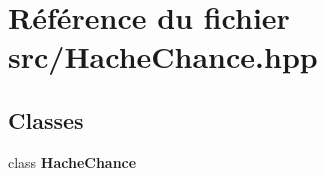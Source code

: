 \section{Référence du fichier src/\-Hache\-Chance.hpp}
\label{_hache_chance_8hpp}
\subsection*{Classes}
\begin{DoxyCompactItemize}
\item 
class {\bf Hache\-Chance}
\end{DoxyCompactItemize}

